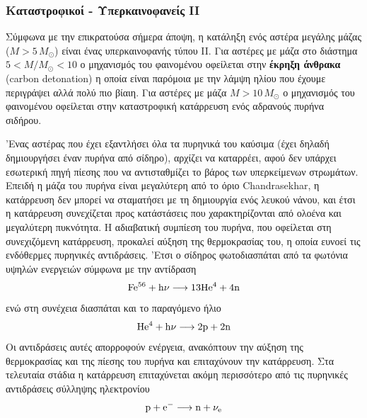\subsubsection{Καταστροφικοί - Υπερκαινοφανείς II}
Σύμφωνα με την επικρατούσα σήμερα άποψη, η κατάληξη ενός αστέρα μεγάλης μάζας ($M > 5\,M_\odot$) είναι ένας υπερκαινοφανής τύπου II. Για αστέρες με μάζα στο διάστημα $5 < M/M_\odot < 10$ ο μηχανισμός του φαινομένου οφείλεται στην \textbf{έκρηξη άνθρακα} (carbon detonation) η οποία είναι παρόμοια με την λάμψη ηλίου που έχουμε περιγράψει αλλά πολύ πιο βίαιη. Για αστέρες με μάζα $M > 10\,M_\odot$ ο μηχανισμός του φαινομένου οφείλεται στην καταστροφική κατάρρευση ενός αδρανούς πυρήνα σιδήρου.

'Ενας αστέρας που έχει εξαντλήσει όλα τα πυρηνικά του καύσιμα (έχει δηλαδή δημιουργήσει έναν πυρήνα από σίδηρο), αρχίζει να καταρρέει, αφού δεν υπάρχει εσωτερική πηγή πίεσης που να αντισταθμίζει το βάρος των υπερκείμενων στρωμάτων. Επειδή η μάζα του πυρήνα είναι μεγαλύτερη από το όριο Chandrasekhar, η κατάρρευση δεν μπορεί να σταματήσει με τη δημιουργία ενός λευκού νάνου, και έτσι η κατάρρευση συνεχίζεται προς κατάστάσεις που χαρακτηρίζονται από ολοένα και μεγαλύτερη πυκνότητα. Η αδιαβατική συμπίεση του πυρήνα, που οφείλεται στη συνεχιζόμενη κατάρρευση, προκαλεί αύξηση της θερμοκρασίας του, η οποία ευνοεί τις ενδόθερμες πυρηνικές αντιδράσεις. 'Ετσι ο σίδηρος φωτοδιασπάται από τα φωτόνια υψηλών ενεργειών σύμφωνα με την αντίδραση
$$\rm Fe^{56} + h\nu \longrightarrow \rm 13 He^4 + 4n$$
ενώ στη συνέχεια διασπάται και το παραγόμενο ήλιο
$$\rm He^4 + h\nu \longrightarrow \rm 2p + 2n$$
Οι αντιδράσεις αυτές απορροφούν ενέργεια, ανακόπτουν την αύξηση της θερμοκρασίας και της πίεσης του πυρήνα και επιταχύνουν την κατάρρευση. Στα τελευταία στάδια η κατάρρευση επιταχύνεται ακόμη περισσότερο από τις πυρηνικές αντιδράσεις σύλληψης ηλεκτρονίου
$$\rm p + e^{-} \longrightarrow \rm n + \nu_e$$

